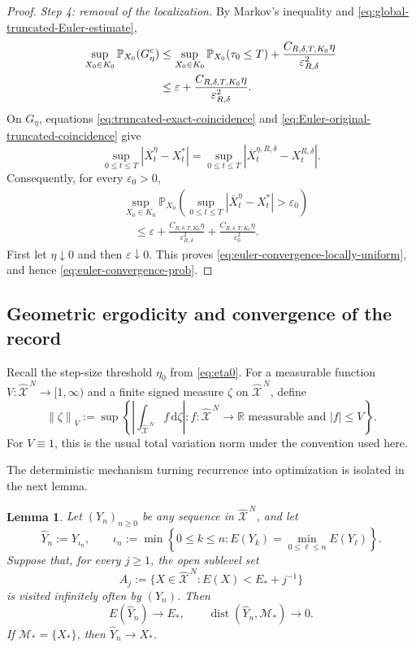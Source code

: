 \documentclass[11pt]{article}
\def\P{\mathbb{P}}
\def\R{\mathbb{R}}
\def\Mc{{\mathcal M}}
\def\Xc{{\mathcal X}}
\def\hX{\widehat{\Xc}^{\,N}}
\newcommand{\dd}{\mathrm{d}}
\newcommand{\dist}{\operatorname{dist}}
\newcommand{\norm}[1]{\left\lVert #1\right\rVert}
\newtheorem{lemma}[theorem]{Lemma}
\theoremstyle{definition}
\theoremstyle{remark}
\numberwithin{equation}{section}
\begin{document}
\begin{proof}
\smallskip
\noindent\textit{Step 4: removal of the localization.}
By Markov's inequality and \eqref{eq:global-truncated-Euler-estimate},
\begin{align}
 \sup_{X_0\in K_0}\P_{X_0}(G_\eta^c)
 &\le\sup_{X_0\in K_0}\P_{X_0}(\tau_0\le T)
 +\frac{C_{R,\delta,T,K_0}\eta}{\varepsilon_{R,\delta}^2}\notag\\
 &\le\varepsilon+
 \frac{C_{R,\delta,T,K_0}\eta}{\varepsilon_{R,\delta}^2}.
 \label{eq:Euler-good-event-probability}
\end{align}
On $G_\eta$, equations \eqref{eq:truncated-exact-coincidence} and
\eqref{eq:Euler-original-truncated-coincidence} give
\[
 \sup_{0\le t\le T}|\overline X_t^\eta-X_t^*|
 =\sup_{0\le t\le T}
 |\overline X_t^{\eta,R,\delta}-X_t^{R,\delta}|.
\]
Consequently, for every $\varepsilon_0>0$,
\begin{align*}
 &\sup_{X_0\in K_0}\P_{X_0}\left(
 \sup_{0\le t\le T}|\overline X_t^\eta-X_t^*|>\varepsilon_0
 \right)\\
 &\quad\le
 \varepsilon+
 \frac{C_{R,\delta,T,K_0}\eta}{\varepsilon_{R,\delta}^2}
 +\frac{C_{R,\delta,T,K_0}\eta}{\varepsilon_0^2}.
\end{align*}
First let $\eta\downarrow0$ and then $\varepsilon\downarrow0$.  This proves
\eqref{eq:euler-convergence-locally-uniform}, and hence
\eqref{eq:euler-convergence-prob}.
\end{proof}


\subsection{Geometric ergodicity and convergence of the record}

Recall the step-size threshold $\eta_0$ from \eqref{eq:eta0}.  For a measurable function
$V:\hX\to[1,\infty)$ and a finite signed measure $\zeta$ on $\hX$, define
\begin{equation}\label{eq:V-norm-definition}
 \norm{\zeta}_V:=\sup\left\{\left|\int_{\hX} f\,\dd\zeta\right|:
 f:\hX\to\R\text{ measurable and }|f|\le V\right\}.
\end{equation}
For $V\equiv1$, this is the usual total variation norm under the convention used here.

The deterministic mechanism turning recurrence into optimization is isolated in the next lemma.

\begin{lemma}\label{lem:running-record-principle}
Let $(Y_n)_{n\ge0}$ be any sequence in $\hX$, and let
\[
 \widehat Y_n:=Y_{\iota_n},
 \qquad
 \iota_n:=\min\left\{0\le k\le n:
 E(Y_k)=\min_{0\le\ell\le n}E(Y_\ell)\right\}.
\]
Suppose that, for every $j\ge1$, the open sublevel set
\[
 A_j:=\{X\in\hX:E(X)<E_*+j^{-1}\}
\]
is visited infinitely often by $(Y_n)$.  Then
\[
 E(\widehat Y_n)\longrightarrow E_*,
 \qquad
 \dist(\widehat Y_n,\Mc_*)\longrightarrow0.
\]
If $\Mc_*=\{X_*\}$, then $\widehat Y_n\to X_*$.
\end{lemma}
\end{document}

